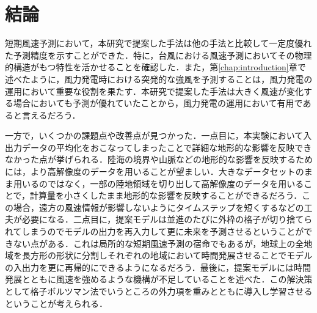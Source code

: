 \chapter{結論}

短期風速予測において，本研究で提案した手法は他の手法と比較して一定度優れた予測精度を示すことができた．特に，台風における風速予測においてその物理的構造がもつ特性を活かせることを確認した．また，第\ref{chap:introduction}章で述べたように，風力発電時における突発的な強風を予測することは，風力発電の運用において重要な役割を果たす．本研究で提案した手法は大きく風速が変化する場合においても予測が優れていたことから，風力発電の運用において有用であると言えるだろう．

一方で，いくつかの課題点や改善点が見つかった．一点目に，本実験において入出力データの平均化をおこなってしまったことで詳細な地形的な影響を反映できなかった点が挙げられる．陸海の境界や山脈などの地形的な影響を反映するためには，より高解像度のデータを用いることが望ましい．大きなデータセットのまま用いるのではなく，一部の陸地領域を切り出して高解像度のデータを用いることで，計算量を小さくしたまま地形的な影響を反映することができるだろう．この場合，遠方の風速情報が影響しないようにタイムステップを短くするなどの工夫が必要になる．二点目に，提案モデルは並進のたびに外枠の格子が切り捨てられてしまうのでモデルの出力を再入力して更に未来を予測させるということができない点がある．これは局所的な短期風速予測の宿命でもあるが，地球上の全地域を長方形の形状に分割しそれぞれの地域において時間発展させることでモデルの入出力を更に再帰的にできるようになるだろう．最後に，提案モデルには時間発展とともに風速を強めるような機構が不足していることを述べた．この解決策として格子ボルツマン法でいうところの外力項\cite{Inamuro2020}を重みとともに導入し学習させるということが考えられる．
